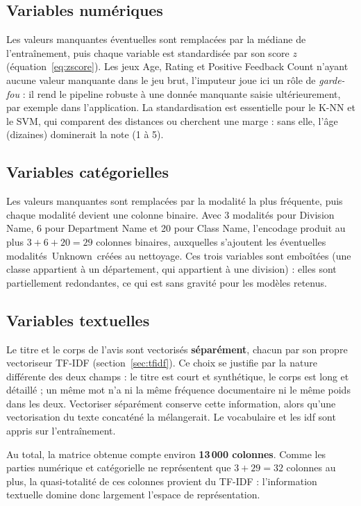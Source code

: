 \documentclass[11pt,a4paper]{report}
\def\og{\guillemotleft\nobreak\,}%
\def\fg{\unskip\nobreak\,\guillemotright}%
\newcommand{\gl}[1]{\og #1\fg{}}       %
\numberwithin{equation}{chapter}
\begin{document}
\subsection{Variables numériques}
Les valeurs manquantes éventuelles sont remplacées par la médiane de l'entraînement, puis chaque variable est standardisée par son score $z$ (équation~\eqref{eq:zscore}). Les jeux Age, Rating et Positive Feedback Count n'ayant aucune valeur manquante dans le jeu brut, l'imputeur joue ici un rôle de \textit{garde-fou} : il rend le pipeline robuste à une donnée manquante saisie ultérieurement, par exemple dans l'application. La standardisation est essentielle pour le K-NN et le SVM, qui comparent des distances ou cherchent une marge : sans elle, l'âge (dizaines) dominerait la note (1 à 5).

\subsection{Variables catégorielles}
Les valeurs manquantes sont remplacées par la modalité la plus fréquente, puis chaque modalité devient une colonne binaire. Avec 3 modalités pour Division Name, 6 pour Department Name et 20 pour Class Name, l'encodage produit au plus $3 + 6 + 20 = 29$ colonnes binaires, auxquelles s'ajoutent les éventuelles modalités \gl{Unknown} créées au nettoyage. Ces trois variables sont emboîtées (une classe appartient à un département, qui appartient à une division) : elles sont partiellement redondantes, ce qui est sans gravité pour les modèles retenus.

\subsection{Variables textuelles}
Le titre et le corps de l'avis sont vectorisés \textbf{séparément}, chacun par son propre vectoriseur TF-IDF (section~\ref{sec:tfidf}). Ce choix se justifie par la nature différente des deux champs : le titre est court et synthétique, le corps est long et détaillé ; un même mot n'a ni la même fréquence documentaire ni le même poids dans les deux. Vectoriser séparément conserve cette information, alors qu'une vectorisation du texte concaténé la mélangerait. Le vocabulaire et les idf sont appris sur l'entraînement.

Au total, la matrice obtenue compte environ \textbf{13\,000 colonnes}. Comme les parties numérique et catégorielle ne représentent que $3 + 29 = 32$ colonnes au plus, la quasi-totalité de ces colonnes provient du TF-IDF : l'information textuelle domine donc largement l'espace de représentation.
\end{document}
